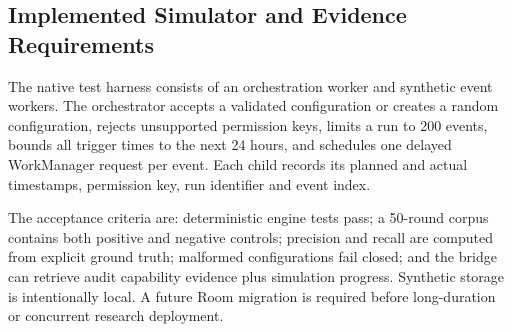 
\subsection{Implemented Simulator and Evidence Requirements}

The native test harness consists of an orchestration worker and synthetic event workers. The orchestrator accepts a validated configuration or creates a random configuration, rejects unsupported permission keys, limits a run to 200 events, bounds all trigger times to the next 24 hours, and schedules one delayed WorkManager request per event. Each child records its planned and actual timestamps, permission key, run identifier and event index.

The acceptance criteria are: deterministic engine tests pass; a 50-round corpus contains both positive and negative controls; precision and recall are computed from explicit ground truth; malformed configurations fail closed; and the bridge can retrieve audit capability evidence plus simulation progress. Synthetic storage is intentionally local. A future Room migration is required before long-duration or concurrent research deployment.
